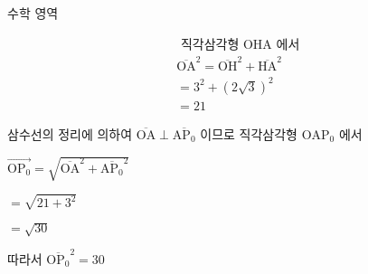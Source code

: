 \documentclass[10pt]{article}
\begin{document}
수학 영역

\[
\begin{aligned}
& \text { 직각삼각형 } \mathrm{OHA} \text { 에서 } \\
& \overline{\mathrm{OA}}^{2}=\overline{\mathrm{OH}}^{2}+\overline{\mathrm{HA}}^{2} \\
&=3^{2}+(2 \sqrt{3})^{2} \\
&=21
\end{aligned}
\]

삼수선의 정리에 의하여 $\overline{\mathrm{OA}} \perp \overline{\mathrm{AP}_{0}}$ 이므로 직각삼각형 $\mathrm{OAP}_{0}$ 에서

$\overrightarrow{\mathrm{OP}_{0}}=\sqrt{\overline{\mathrm{OA}}^{2}+{\overline{\mathrm{AP}_{0}}}^{2}}$

$=\sqrt{21+3^{2}}$

$=\sqrt{30}$

따라서 ${\overline{\mathrm{OP}_{0}}}^{2}=30$
\end{document}
